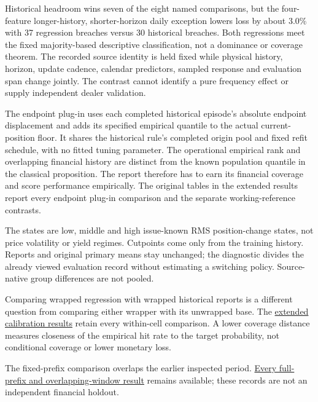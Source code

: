 \documentclass[12pt,a4paper]{article}
\begin{document}
Historical headroom wins seven of the eight named comparisons, but the
four-feature longer-history, shorter-horizon daily exception lowers loss by
about 3.0\% with 37 regression breaches versus 30 historical breaches.
Both regressions meet the fixed majority-based descriptive classification,
not a dominance or coverage theorem. The recorded source identity is held fixed while physical history, horizon, update cadence, calendar predictors, sampled response and evaluation span change jointly. The contrast cannot
identify a pure frequency effect or supply independent dealer validation.

The endpoint plug-in uses each completed historical episode's
absolute endpoint displacement and adds its specified empirical quantile to
the actual current-position floor. It shares the historical rule's completed
origin pool and fixed refit schedule, with no fitted tuning parameter.
The operational empirical rank and overlapping financial history are distinct
from the known population quantile in the classical proposition. The report
therefore has to earn its financial coverage and score performance empirically.
The original tables in the extended results report every endpoint plug-in comparison and the separate working-reference contrasts.

The states are low, middle and high issue-known RMS position-change
states, not price volatility or yield regimes. Cutpoints come only from the
training history. Reports and original primary means stay unchanged; the
diagnostic divides the already viewed evaluation record without estimating a
switching policy. Source-native group differences are not pooled.

Comparing wrapped regression with wrapped historical reports is a
different question from comparing either wrapper with its unwrapped base.
The \href{https://github.com/ByronLi0207/financial-mathematics-paper-20261020/blob/submission-final/EXTENDED_RESULTS.md#asmbi-extended-s17}{extended calibration results} retain every within-cell comparison. A lower coverage distance measures closeness of the empirical hit rate to the target probability, not conditional coverage or lower monetary loss.

The fixed-prefix comparison overlaps the earlier inspected period. \href{https://github.com/ByronLi0207/financial-mathematics-paper-20261020/blob/submission-final/EXTENDED_RESULTS.md#asmbi-extended-s26}{Every full-prefix and overlapping-window result} remains available; these records are not an independent financial holdout.
\end{document}
